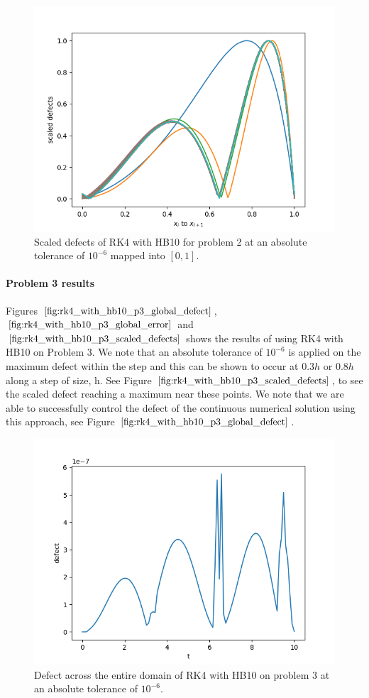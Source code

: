 \begin{figure}[H]
\centering
\includegraphics[width=0.7\linewidth]{./figures/rk4_with_hb10_p2_scaled_defects}
\caption{Scaled defects of RK4 with HB10 for problem 2 at an absolute tolerance of $10^{-6}$ mapped into $[0, 1]$.}
\label{fig:rk4_with_hb10_p2_scaled_defects}
\end{figure}

\paragraph{Problem 3 results}
Figures $\ref{fig:rk4_with_hb10_p3_global_defect}$, $\ref{fig:rk4_with_hb10_p3_global_error}$ and $\ref{fig:rk4_with_hb10_p3_scaled_defects}$ shows the results of using RK4 with HB10 on Problem 3. 
We note that an absolute tolerance of $10^{-6}$ is applied on the maximum defect within the step and this can be shown to occur at $0.3h$ or $0.8h$ along a step of size, h.  See Figure $\ref{fig:rk4_with_hb10_p3_scaled_defects}$, to see the scaled defect reaching a maximum near these points. We note that we are able to successfully control the defect of the continuous numerical solution using this approach, see Figure $\ref{fig:rk4_with_hb10_p3_global_defect}$. 

\begin{figure}[H]
\centering
\includegraphics[width=0.7\linewidth]{./figures/rk4_with_hb10_p3_global_defect}
\caption{Defect across the entire domain of RK4 with HB10 on problem 3 at an absolute tolerance of $10^{-6}$.}
\label{fig:rk4_with_hb10_p3_global_defect}
\end{figure}

